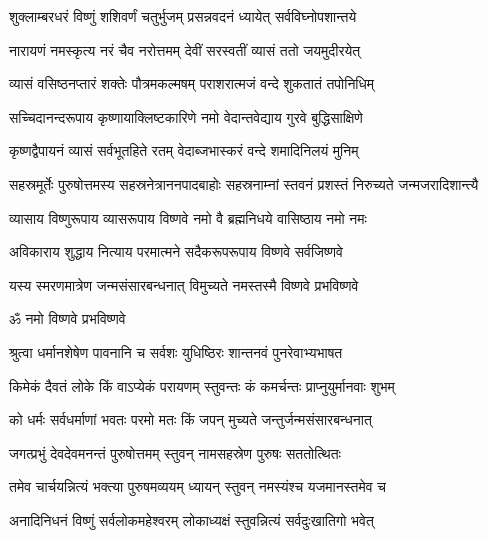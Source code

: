 
\twolineshloka
{शुक्लाम्बरधरं विष्णुं शशिवर्णं चतुर्भुजम्}
{प्रसन्नवदनं ध्यायेत् सर्वविघ्नोपशान्तये}

\twolineshloka
{नारायणं नमस्कृत्य नरं चैव नरोत्तमम्}
{देवीं सरस्वतीं व्यासं ततो जयमुदीरयेत्}

\twolineshloka
{व्यासं वसिष्ठनप्तारं शक्तेः पौत्रमकल्मषम्}
{पराशरात्मजं वन्दे शुकतातं तपोनिधिम्}

\twolineshloka
{सच्चिदानन्दरूपाय कृष्णायाक्लिष्टकारिणे}
{नमो वेदान्तवेद्याय गुरवे बुद्धिसाक्षिणे}

\twolineshloka
{कृष्णद्वैपायनं व्यासं सर्वभूतहिते रतम्}
{वेदाब्जभास्करं वन्दे शमादिनिलयं मुनिम्}

\fourlineindentedshloka
{सहस्रमूर्तेः पुरुषोत्तमस्य}
{सहस्रनेत्राननपादबाहोः}
{सहस्रनाम्नां स्तवनं प्रशस्तं}
{निरुच्यते जन्मजरादिशान्त्यै}

\twolineshloka
{व्यासाय विष्णुरूपाय व्यासरूपाय विष्णवे}
{नमो वै ब्रह्मनिधये वासिष्ठाय नमो नमः}

\twolineshloka
{अविकाराय शुद्धाय नित्याय परमात्मने}
{सदैकरूपरूपाय विष्णवे सर्वजिष्णवे}

\twolineshloka
{यस्य स्मरणमात्रेण जन्मसंसारबन्धनात्}
{विमुच्यते नमस्तस्मै विष्णवे प्रभविष्णवे}

\centerline{ॐ नमो विष्णवे प्रभविष्णवे}

\twolineshloka
{श्रुत्वा धर्मानशेषेण पावनानि च सर्वशः}
{युधिष्ठिरः शान्तनवं पुनरेवाभ्यभाषत}

\twolineshloka
{किमेकं दैवतं लोके किं वाऽप्येकं परायणम्}
{स्तुवन्तः कं कमर्चन्तः प्राप्नुयुर्मानवाः शुभम्}

\twolineshloka
{को धर्मः सर्वधर्माणां भवतः परमो मतः}
{किं जपन् मुच्यते जन्तुर्जन्मसंसारबन्धनात्}

\twolineshloka
{जगत्प्रभुं देवदेवमनन्तं पुरुषोत्तमम्}
{स्तुवन् नामसहस्रेण पुरुषः सततोत्थितः}

\twolineshloka
{तमेव चार्चयन्नित्यं भक्त्या पुरुषमव्ययम्}
{ध्यायन् स्तुवन् नमस्यंश्च यजमानस्तमेव च}

\twolineshloka
{अनादिनिधनं विष्णुं सर्वलोकमहेश्वरम्}
{लोकाध्यक्षं स्तुवन्नित्यं सर्वदुःखातिगो भवेत्}

